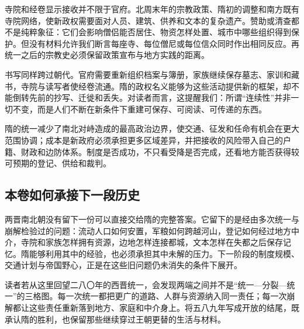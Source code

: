 寺院和经卷显示接收并不限于官府。北周末年的宗教政策、隋初的调整和南方既有寺院网络，使新政权需要面对人员、建筑、供养和文本的复杂遗产。赞助或清查都不是纯粹象征：它们会影响僧侣能否居住、物资怎样处置、城市中哪些组织得到保护。但没有材料允许我们断言每座寺、每位僧尼或每位信众同时作出相同反应。再统一之后的宗教史必须保留政策宣布与地方实践的距离。

书写同样跨过朝代。官府需要重新组织档案与簿册，家族继续保存墓志、家训和藏书，寺院与读写者使经卷流通。隋的政权名义能够为这些活动提供新的框架，却不能倒转先前的抄写、迁徙和丢失。对读者而言，这提醒我们：所谓“连续性”并非一切不变，而是人们不断在新条件下重建可保存、可阅读、可传递的东西。

\begin{turningpoint}
隋的统一减少了南北对峙造成的最高政治边界，使交通、征发和任命有机会在更大范围协调；成本是新政府必须承担更多区域差异，并把接收的风险带入自己的户籍、财政和边防体系。制度是否成功，不只看受降是否完成，还看地方能否获得较可预期的登记、供给和裁判。
\end{turningpoint}

\subsection{本卷如何承接下一段历史}

两晋南北朝没有留下一份可以直接交给隋的完整答案。它留下的是经由多次统一与崩解检验过的问题：流动人口如何安置，军粮如何跨越河山，登记如何经过地方中介，寺院和家族怎样拥有资源，边地怎样连接都城，文本怎样在失都之后保存记忆。隋能够利用其中的经验，也必须承担其中未解的压力。下一阶段的制度规模、交通计划与帝国野心，正是在这些旧问题仍未消失的条件下展开。

读者若从这里回望二八〇年的西晋统一，会发现两端之间并不是“统一—分裂—统一”的三格图。每一次统一都把更广的道路、人群与资源纳入同一责任；每一次崩解都让这些责任重新落到地方、家庭和中介身上。将五八九年写成开放的结尾，既承认隋的胜利，也保留那些继续穿过王朝更替的生活与材料。
